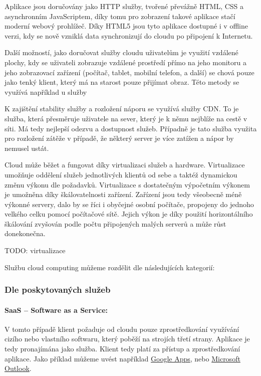 Aplikace jsou doručovány jako HTTP služby, tvořené převážně HTML, CSS a asynchronním JavaScriptem, díky tomu pro zobrazení takové aplikace stačí moderní webový prohlížeč. Díky HTML5 jsou tyto aplikace dostupné i v offline verzi, kdy se nově vzniklá data synchronizují do cloudu po připojení k Internetu.

Další možností, jako doručovat služby cloudu uživatelům je využití vzdálené plochy, kdy se uživateli zobrazuje vzdálené prostředí přímo na jeho monitoru a jeho zobrazovací zařízení (počítač, tablet, mobilní telefon, a další) se chová pouze jako tenký klient, který má na starost pouze přijímat obraz. Této metody se využívá například u služby 

K zajištění stability služby a rozložení náporu se využívá služby CDN. To je služba, která přesměruje uživatele na sever, který je k němu nejblíže na cestě v síti. Má tedy nejlepší odezvu a dostupnost služeb. Případně je tato služba využita pro rozložení zátěže v případě, že některý server je více zatížen a nápor by nemusel ustát.

Cloud může běžet a fungovat díky virtualizaci služeb a hardware. Virtualizace umožňuje oddělení služeb jednotlivých klientů od sebe a taktéž dynamickou změnu výkonu dle požadavků. Virtualizace s dostatečným výpočetním výkonem je umožněna díky škálovatelnosti zařízení. Zařízení jsou tedy všeobecně méně výkonné servery, dalo by se říci i obyčejné osobní počítače, propojeny do jednoho velkého celku pomocí počítačové sítě. Jejich výkon je díky použití horizontálního škálování zvyšován podle počtu připojených malých serverů a může růst donekonečna. 

TODO: virtualizace


Službu cloud computing můžeme rozdělit dle následujících kategorií:
\subsubsection{Dle poskytovaných služeb}

\paragraph{SaaS -- Software as a Service:}
V tomto případě klient požaduje od cloudu pouze zprostředkování využívání cizího nebo vlastního softwaru, který poběží na strojích třetí strany. Aplikace je tedy pronajímána jako služba. Klient tedy platí za přístup a zprostředkování aplikace. Jako příklad můžeme uvést například \href{apps.google.com}{Google Apps}, nebo \href{http://domains.live.com}{Microsoft Outlook}.

